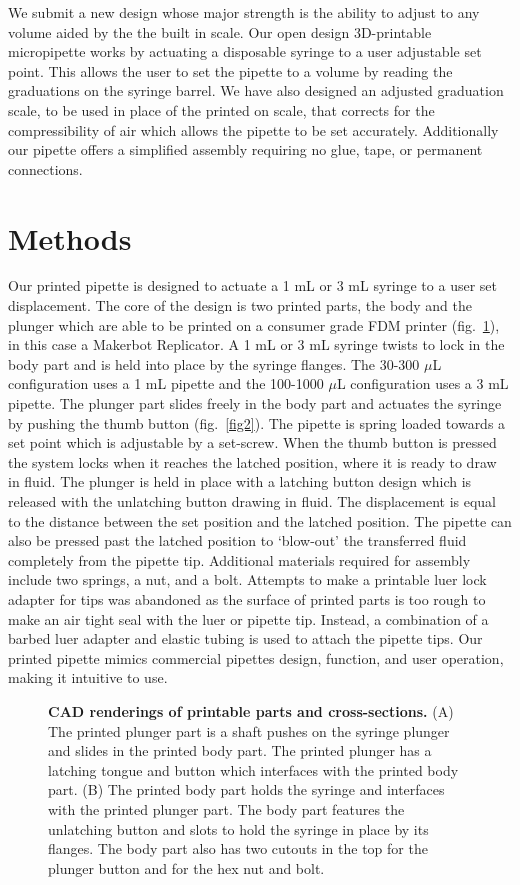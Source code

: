 \documentclass[10pt,letterpaper]{article}
\begin{document}
We submit a new design whose major strength is the ability to adjust to any volume aided by the the built in scale.
Our open design 3D-printable micropipette works by actuating a disposable syringe to a user adjustable set point.
This allows the user to set the pipette to a volume by reading the graduations on the syringe barrel.
We have also designed an adjusted graduation scale, to be used in place of the printed on scale, that corrects for the compressibility of air which allows the pipette to be set accurately.
Additionally our pipette offers a simplified assembly requiring no glue, tape, or permanent connections.

\section*{Methods}
Our printed pipette is designed to actuate a 1 mL or 3 mL syringe to a user set displacement.
The core of the design is two printed parts, the body and the plunger which are able to be printed on a consumer grade FDM printer (fig.~\ref{fig1}), in this case a Makerbot Replicator.
A 1 mL or 3 mL syringe twists to lock in the body part and is held into place by the syringe flanges.
The 30-300 $\mu$L configuration uses a 1 mL pipette and the 100-1000 $\mu$L configuration uses a 3 mL pipette.
The plunger part slides freely in the body part and actuates the syringe by pushing the thumb button (fig.~\ref{fig2}). 
The pipette is spring loaded towards a set point which is adjustable by a set-screw.
When the thumb button is pressed the system locks when it reaches the latched position, where it is ready to draw in fluid.
The plunger is held in place with a latching button design which is released with the unlatching button drawing in fluid.
The displacement is equal to the distance between the set position and the latched position.
The pipette can also be pressed past the latched position to `blow-out' the transferred fluid completely from the pipette tip.   
Additional materials required for assembly include two springs, a nut, and a bolt.
Attempts to make a printable luer lock adapter for tips was abandoned as the surface of printed parts is too rough to make an air tight seal with the luer or pipette tip.
Instead, a combination of a barbed luer adapter and elastic tubing is used to attach the pipette tips.
Our printed pipette mimics commercial pipettes design, function, and user operation, making it intuitive to use.

\begin{figure}
	\caption{
		{\bf CAD renderings of printable parts and cross-sections.} (A) The printed plunger part is a shaft pushes on the syringe plunger and slides in the printed body part. The printed plunger has a latching tongue and button which interfaces with the printed body part. (B) The printed body part holds the syringe and interfaces with the printed plunger part. The body part features the unlatching button and slots to hold the syringe in place by its flanges. The body part also has two cutouts in the top for the plunger button and for the hex nut and bolt.
	}
	\label{fig1}
\end{figure}
\end{document}
